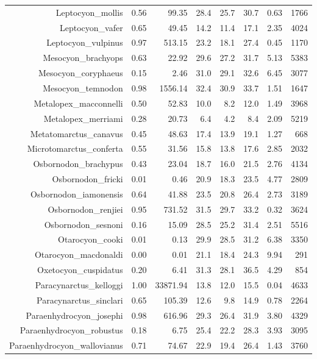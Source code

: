 \begin{table}[ht]
\begin{tabular}{rrrrrrrr}
  Leptocyon\_mollis & 0.56 & 99.35 & 28.4 & 25.7 & 30.7 & 0.63 & 1766 \\ 
  Leptocyon\_vafer & 0.65 & 49.45 & 14.2 & 11.4 & 17.1 & 2.35 & 4024 \\ 
  Leptocyon\_vulpinus & 0.97 & 513.15 & 23.2 & 18.1 & 27.4 & 0.45 & 1170 \\ 
  Mesocyon\_brachyops & 0.63 & 22.92 & 29.6 & 27.2 & 31.7 & 5.13 & 5383 \\ 
  Mesocyon\_coryphaeus & 0.15 & 2.46 & 31.0 & 29.1 & 32.6 & 6.45 & 3077 \\ 
  Mesocyon\_temnodon & 0.98 & 1556.14 & 32.4 & 30.9 & 33.7 & 1.51 & 1647 \\ 
  Metalopex\_macconnelli & 0.50 & 52.83 & 10.0 & 8.2 & 12.0 & 1.49 & 3968 \\ 
  Metalopex\_merriami & 0.28 & 20.73 & 6.4 & 4.2 & 8.4 & 2.09 & 5219 \\ 
  Metatomarctus\_canavus & 0.45 & 48.63 & 17.4 & 13.9 & 19.1 & 1.27 & 668 \\ 
  Microtomarctus\_conferta & 0.55 & 31.56 & 15.8 & 13.8 & 17.6 & 2.85 & 2032 \\ 
  Osbornodon\_brachypus & 0.43 & 23.04 & 18.7 & 16.0 & 21.5 & 2.76 & 4134 \\ 
  Osbornodon\_fricki & 0.01 & 0.46 & 20.9 & 18.3 & 23.5 & 4.77 & 2809 \\ 
  Osbornodon\_iamonensis & 0.64 & 41.88 & 23.5 & 20.8 & 26.4 & 2.73 & 3189 \\ 
  Osbornodon\_renjiei & 0.95 & 731.52 & 31.5 & 29.7 & 33.2 & 0.32 & 3624 \\ 
  Osbornodon\_sesnoni & 0.16 & 15.09 & 28.5 & 25.2 & 31.4 & 2.51 & 5516 \\ 
  Otarocyon\_cooki & 0.01 & 0.13 & 29.9 & 28.5 & 31.2 & 6.38 & 3350 \\ 
  Otarocyon\_macdonaldi & 0.00 & 0.01 & 21.1 & 18.4 & 24.3 & 9.94 & 291 \\ 
  Oxetocyon\_cuspidatus & 0.20 & 6.41 & 31.3 & 28.1 & 36.5 & 4.29 & 854 \\ 
  Paracynarctus\_kelloggi & 1.00 & 33871.94 & 13.8 & 12.0 & 15.5 & 0.04 & 4633 \\ 
  Paracynarctus\_sinclari & 0.65 & 105.39 & 12.6 & 9.8 & 14.9 & 0.78 & 2264 \\ 
  Paraenhydrocyon\_josephi & 0.98 & 616.96 & 29.3 & 26.4 & 31.9 & 3.80 & 4329 \\ 
  Paraenhydrocyon\_robustus & 0.18 & 6.75 & 25.4 & 22.2 & 28.3 & 3.93 & 3095 \\ 
  Paraenhydrocyon\_wallovianus & 0.71 & 74.67 & 22.9 & 19.4 & 26.4 & 1.43 & 3760 \\ 

\end{tabular}
\end{table}
